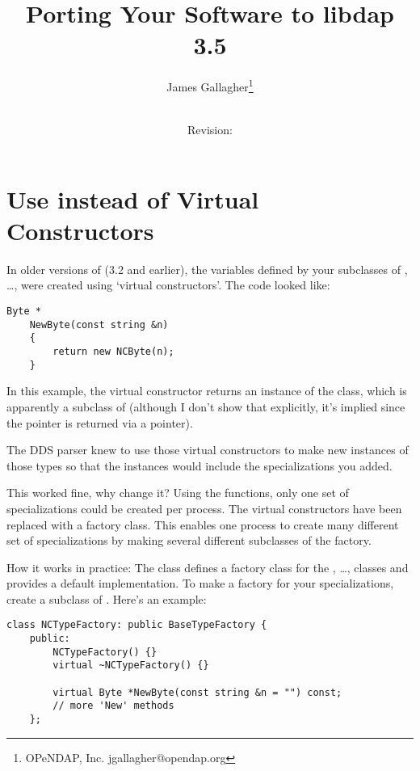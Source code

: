 \documentclass[justify]{dods-paper}
\title{Porting Your Software to libdap 3.5}
\author{James Gallagher\thanks{OPeNDAP, Inc. jgallagher@opendap.org}}
\date{\rcsInfoDate \\ Revision: \rcsInfoRevision}
\begin{document}
\maketitle
\T\tableofcontents

\section{Use  instead of Virtual Constructors}

In older versions of  (3.2 and earlier), the variables
defined by your subclasses of , \ldots,  were
created using `virtual constructors'\cite{meyers:ecpp}. The code
looked like:

\begin{lstlisting}[caption={Old Style Virtual Constructor}]
    Byte *
    NewByte(const string &n)
    {
        return new NCByte(n);
    }
\end{lstlisting}

In this example, the virtual constructor returns an instance of the
 class, which is apparently a subclass of 
(although I don't show that explicitly, it's implied since the
 pointer is returned via a  pointer).

The DDS parser knew to use those virtual constructors to make new
instances of those types so that the instances would include the
specializations you added.

This worked fine, why change it? Using the functions, only one set of
specializations could be created per process. The virtual constructors
have been replaced with a factory class. This enables one process to
create many different set of specializations by making several
different subclasses of the factory.

How it works in practice: The class  defines a factory
class for the , \ldots,  classes and provides a
default implementation. To make a factory for your specializations,
create a subclass of . Here's an example:

\begin{lstlisting}[caption={New Factory Declaration}]
    class NCTypeFactory: public BaseTypeFactory {
    public:
        NCTypeFactory() {} 
        virtual ~NCTypeFactory() {}

        virtual Byte *NewByte(const string &n = "") const;
        // more 'New' methods
    };
\end{lstlisting}
\end{document}
